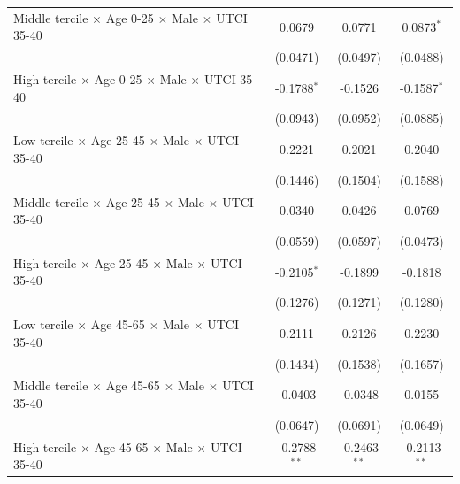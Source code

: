 \begin{table}[htbp]
\begin{tabular}{lccc}
      Middle tercile $\times$ Age 0-25 $\times$ Male $\times$ UTCI 35-40        & 0.0679         & 0.0771            & 0.0873$^{*}$\\   
                                                                                & (0.0471)       & (0.0497)          & (0.0488)\\   
      High tercile $\times$ Age 0-25 $\times$ Male $\times$ UTCI 35-40          & -0.1788$^{*}$  & -0.1526           & -0.1587$^{*}$\\   
                                                                                & (0.0943)       & (0.0952)          & (0.0885)\\   
      Low tercile $\times$ Age 25-45 $\times$ Male $\times$ UTCI 35-40          & 0.2221         & 0.2021            & 0.2040\\   
                                                                                & (0.1446)       & (0.1504)          & (0.1588)\\   
      Middle tercile $\times$ Age 25-45 $\times$ Male $\times$ UTCI 35-40       & 0.0340         & 0.0426            & 0.0769\\   
                                                                                & (0.0559)       & (0.0597)          & (0.0473)\\   
      High tercile $\times$ Age 25-45 $\times$ Male $\times$ UTCI 35-40         & -0.2105$^{*}$  & -0.1899           & -0.1818\\   
                                                                                & (0.1276)       & (0.1271)          & (0.1280)\\   
      Low tercile $\times$ Age 45-65 $\times$ Male $\times$ UTCI 35-40          & 0.2111         & 0.2126            & 0.2230\\   
                                                                                & (0.1434)       & (0.1538)          & (0.1657)\\   
      Middle tercile $\times$ Age 45-65 $\times$ Male $\times$ UTCI 35-40       & -0.0403        & -0.0348           & 0.0155\\   
                                                                                & (0.0647)       & (0.0691)          & (0.0649)\\   
      High tercile $\times$ Age 45-65 $\times$ Male $\times$ UTCI 35-40         & -0.2788$^{**}$ & -0.2463$^{**}$    & -0.2113$^{**}$\\   

\end{tabular}
\end{table}
